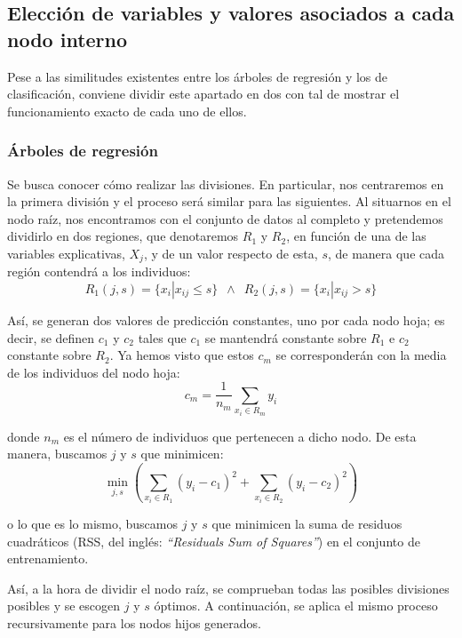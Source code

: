 \documentclass[12pt,twoside]{article}
\begin{document}
\subsection{Elección de variables y valores asociados a cada nodo interno} \label{sec: subsec22}

Pese a las similitudes existentes entre los árboles de regresión y los de clasificación, conviene dividir este apartado en dos con tal de mostrar el funcionamiento exacto de cada uno de ellos.


\subsubsection*{Árboles de regresión}
Se busca conocer cómo realizar las divisiones. En particular, nos centraremos en la primera división y el proceso será similar para las siguientes. Al situarnos en el nodo raíz, nos encontramos con el conjunto de datos al completo y pretendemos dividirlo en dos regiones, que denotaremos $R_1$ y $R_2$, en función de una de las variables explicativas, $X_j$, y de un valor respecto de esta, $s$, de manera que cada región contendrá a los individuos:
\begin{equation*}
R_1 (j,s) = \{ x_i | x_{ij} \leq s \} \, \, \, \wedge \, \, \,  R_2 (j,s) = \{ x_{i} | x_{ij} > s\}
\end{equation*}

Así, se generan dos valores de predicción constantes, uno por cada nodo hoja; es decir, se definen $c_1$ y $c_2$ tales que $c_1$ se mantendrá constante sobre $R_1$ e $c_2$ constante sobre $R_2$. Ya hemos visto que estos $c_m$ se corresponderán con la media de los individuos del nodo hoja:
\begin{equation*}
c_m = \frac{1}{n_m}\sum_{x_i \in R_m} y_i
\end{equation*}

\noindent
donde $n_m$ es el número de individuos que pertenecen a dicho nodo. De esta manera, buscamos $j$ y $s$ que minimicen:
\begin{equation*}
\min_{j,s} \left( \sum_{x_i \in R_1}(y_i - c_1)^2 + \sum_{x_i \in R_2}(y_i - c_2)^2 \right)
\end{equation*}

\noindent
o lo que es lo mismo, buscamos $j$ y $s$ que minimicen la suma de residuos cuadráticos (RSS, del inglés: \textit{``Residuals Sum of Squares''}) en el conjunto de entrenamiento.

Así, a la hora de dividir el nodo raíz, se comprueban todas las posibles divisiones posibles y se escogen $j$ y $s$ óptimos. A continuación, se aplica el mismo proceso recursivamente para los nodos hijos generados.
\end{document}
